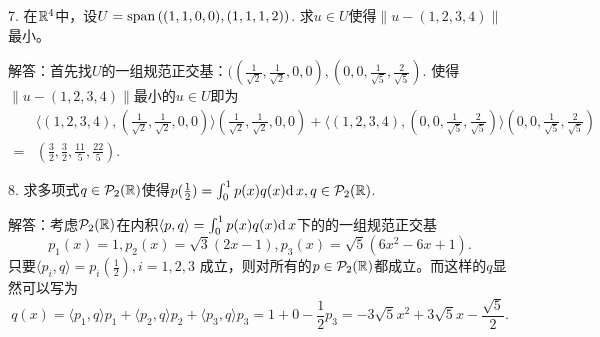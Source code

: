 \documentclass[hyperref,]{ctexart}
\begin{document}
\bigskip

\noindent{} 7. 在\(\mathbb{R}^4\)中，设\(U=\mathrm{span}\,((1,1,0,0),(1,1,1,2))\).
求\(u\in U\)使得\(\|u-(1,2,3,4)\|\)最小。

\smallskip

\noindent{}
解答：首先找\(U\)的一组规范正交基：\(((\frac{1}{\sqrt{2}},\frac{1}{\sqrt{2}},0, 0),(0,0,\frac{1}{\sqrt{5}},\frac{2}{\sqrt{5}})\).
使得\(\|u-(1,2,3,4)\|\)最小的\(u\in U\)即为 \[
\begin{aligned}
&\langle (1,2,3,4),(\frac{1}{\sqrt{2}},\frac{1}{\sqrt{2}},0, 0)\rangle(\frac{1}{\sqrt{2}},\frac{1}{\sqrt{2}},0, 0) +\langle (1,2,3,4),(0,0,\frac{1}{\sqrt{5}},\frac{2}{\sqrt{5}})\rangle(0,0,\frac{1}{\sqrt{5}},\frac{2}{\sqrt{5}})\\ = 
&(\frac32,\frac32,\frac{11}{5},\frac{22}{5}).
\end{aligned}\]

\bigskip

\noindent{} 8.
求多项式\(q\in\mathcal{P}_2(\mathbb{R})\)使得\(p(\frac12)=\int_0^1p(x)q(x)\mathrm{d}\, x,q\in\mathcal{P}_2(\mathbb{R})\).

\smallskip

\noindent{}
解答：考虑\(\mathcal{P}_2(\mathbb{R})\)在内积\(\langle p,q\rangle =\int_0^1 p(x)q(x)\mathrm{d}\, x\)下的的一组规范正交基
\[p_1(x)=1 ,p_2(x)=\sqrt{3}(2x-1),p_3(x)=\sqrt{5}(6x^2-6x+1).\]
只要\(\langle p_i,q\rangle = p_i(\frac12),i=1,2,3\)
成立，则对所有的\(p\in\mathcal{P}_2(\mathbb{R})\)都成立。而这样的\(q\)显然可以写为
\[q(x) = \langle p_1,q\rangle p_1+ \langle p_2,q\rangle p_2 +\langle p_3,q\rangle  p_3
 = 1 + 0 -\frac12 p_3 =-3\sqrt{5}x^2+3\sqrt{5}x-\frac{\sqrt{5}}{2}.\]
\end{document}
